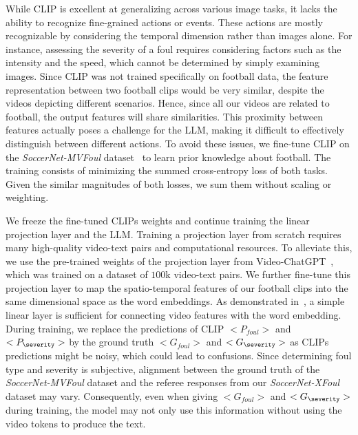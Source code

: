 While CLIP is excellent at generalizing across various image tasks, it lacks the ability to recognize fine-grained actions or events. These actions are mostly recognizable by considering the temporal dimension rather than images alone. For instance, assessing the severity of a foul requires considering factors such as the intensity and the speed, which cannot be determined by simply examining images. 
Since CLIP was not trained specifically on football data, the feature representation between two football clips would be very similar, despite the videos depicting different scenarios.
Hence, since all our videos are related to football, the output features will share similarities. This proximity between features actually poses a challenge for the LLM, making it difficult to effectively distinguish between different actions.
To avoid these issues, we fine-tune CLIP on the \textit{SoccerNet-MVFoul} dataset~\cite{Held2023VARS} to learn prior knowledge about football. 
The training consists of minimizing the summed cross-entropy loss of both tasks. 
Given the similar magnitudes of both losses, we sum them without scaling or weighting.

We freeze the fine-tuned CLIPs weights and continue training the linear projection layer and the LLM.
Training a projection layer from scratch requires many high-quality video-text pairs and computational resources.
To alleviate this, we use the pre-trained weights of the projection layer from Video-ChatGPT~\cite{Maaz2023VideoChatGPT-arxiv}, which was trained on a dataset of $100$k video-text pairs.
We further fine-tune this projection layer to map the spatio-temporal features of our football clips into the same dimensional space as the word embeddings.
As demonstrated in~\cite{Maaz2023VideoChatGPT-arxiv, Liu2023Visual-arxiv, Zhu2023MiniGPT4-arxiv, Lyu2023MacawLLM-arxiv}, a simple linear layer is sufficient for connecting video features with the word embedding.
During training, we replace the predictions of CLIP $<P_{foul}>$ and $<P_{\severity}>$ by the ground truth $<G_{foul}>$ and $ <G_{\severity}>$ as CLIPs predictions might be noisy, which could lead to confusions.
Since determining foul type and severity is subjective, alignment between the ground truth of the \textit{SoccerNet-MVFoul} dataset and the referee responses from our \textit{SoccerNet-XFoul} dataset may vary. Consequently, even when giving $<G_{foul}>$ and $<G_{\severity}>$ during training, the model may not only use this information without using the video tokens to produce the text. %

